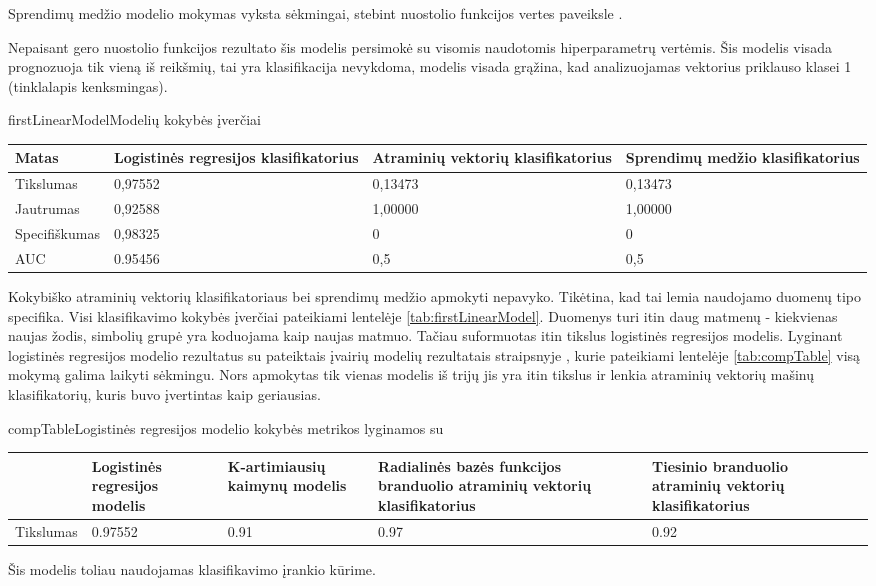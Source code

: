 Sprendimų medžio modelio mokymas vyksta sėkmingai, stebint nuostolio funkcijos vertes paveiksle .

Nepaisant gero nuostolio funkcijos rezultato šis modelis persimokė su visomis naudotomis
hiperparametrų vertėmis. Šis modelis visada prognozuoja tik vieną iš reikšmių, tai yra
klasifikacija nevykdoma, modelis visada grąžina, kad analizuojamas vektorius priklauso klasei 1 (tinklalapis kenksmingas).



\begin{ktutable}{firstLinearModel}{Modelių kokybės įverčiai}
    \begin{tabular}{| l | p{4cm} | p{4cm} | p{4cm} |}
    \hline
               Matas & Logistinės regresijos klasifikatorius & Atraminių vektorių klasifikatorius & Sprendimų medžio klasifikatorius \\\hline
               Tikslumas & 0,97552 & 0,13473 & 0,13473 \\ \hline
               Jautrumas & 0,92588 & 1,00000 & 1,00000 \\ \hline
               Specifiškumas & 0,98325 & 0 & 0 \\ \hline
               AUC & 0.95456 & 0,5 & 0,5 \\ \hline
    \end{tabular}
\end{ktutable}

Kokybiško atraminių vektorių klasifikatoriaus bei sprendimų medžio apmokyti nepavyko.
Tikėtina, kad tai lemia naudojamo duomenų tipo specifika. Visi klasifikavimo kokybės įverčiai pateikiami lentelėje \vref{tab:firstLinearModel}. Duomenys turi itin daug
matmenų - kiekvienas naujas žodis, simbolių grupė yra koduojama kaip naujas matmuo.
Tačiau suformuotas itin tikslus logistinės regresijos modelis. Lyginant logistinės regresijos modelio rezultatus
su pateiktais įvairių modelių rezultatais straipsnyje \cite{comp}, kurie pateikiami
lentelėje \vref{tab:compTable} visą mokymą galima laikyti sėkmingu. Nors apmokytas
tik vienas modelis iš trijų jis yra itin tikslus ir lenkia atraminių vektorių mašinų klasifikatorių, kuris buvo įvertintas kaip geriausias.

\begin{ktutable}{compTable}{Logistinės regresijos modelio kokybės metrikos lyginamos su \cite{comp}}
    \begin{tabular}{|l|p{3cm}|p{3cm}|p{3cm}|p{3cm}|}
    \hline
                             & Logistinės regresijos modelis  &  K-artimiausių kaimynų modelis  &  Radialinės bazės funkcijos branduolio atraminių vektorių klasifikatorius  &  Tiesinio branduolio atraminių vektorių klasifikatorius \\ \hline
               Tikslumas     & 0.97552           & 0.91   & 0.97  &  0.92         \\ \hline
    \end{tabular}
\end{ktutable}

Šis modelis toliau naudojamas klasifikavimo įrankio kūrime.
